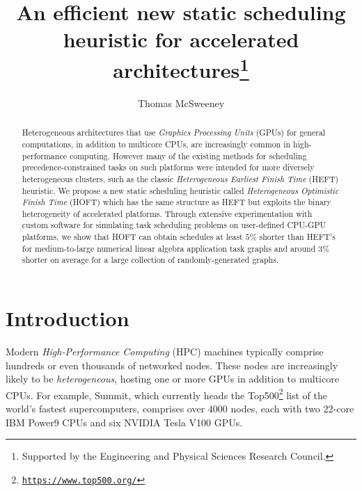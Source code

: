 \documentclass[runningheads]{llncs}
\begin{document}
%
\title{An efficient new static scheduling heuristic for accelerated architectures\thanks{Supported by the Engineering and Physical Sciences Research Council.}}
%
%
\author{Thomas McSweeney }
%
%
%
\maketitle              %
%
\begin{abstract}

Heterogeneous architectures that use {\em Graphics Processing Units} (GPUs) for general computations, in addition to multicore CPUs, are increasingly common in high-performance computing. However many of the existing methods for scheduling precedence-constrained tasks on such platforms were intended for more diversely heterogeneous clusters, such as the classic {\em Heterogeneous Earliest Finish Time} (HEFT) heuristic. We propose a new static scheduling heuristic called {\em Heterogeneous Optimistic Finish Time} (HOFT) which has the same structure as HEFT but exploits the binary heterogeneity of accelerated platforms. Through extensive experimentation with custom software for simulating task scheduling problems on user-defined CPU-GPU platforms, we show that HOFT can obtain schedules at least $5\%$ shorter than HEFT's for medium-to-large numerical linear algebra application task graphs and around $3\%$ shorter on average for a large collection of randomly-generated graphs.   


\end{abstract}


\section{Introduction}
\label{sect.intro}

Modern {\em High-Performance Computing} (HPC) machines typically comprise hundreds or even thousands of networked nodes. These nodes are increasingly likely to be {\em heterogeneous}, hosting one or more GPUs in addition to multicore CPUs. For example, Summit, which currently heads the Top500\footnote{\href{https://www.top500.org/}{{\tt \small https://www.top500.org/}}} list of the world's fastest supercomputers, comprises over $4000$ nodes, each with two 22-core IBM Power9 CPUs and six NVIDIA Tesla V100 GPUs. 
\end{document}
